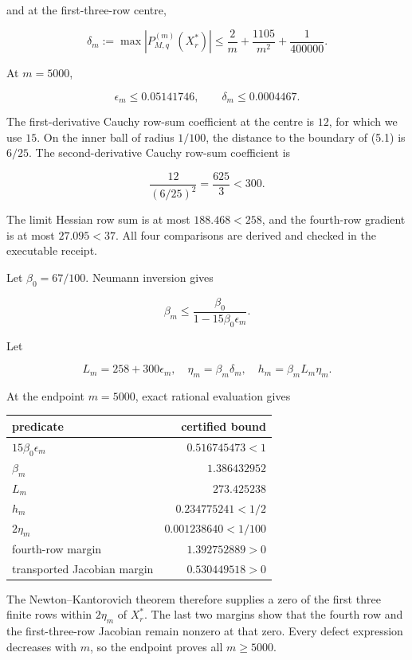 \documentclass[
  11pt,
  a4paper,
]{article}
\newcounter{none} %
\begin{document}
and at the first-three-row centre,

\[
\delta_m:=\max|P^{(m)}_{M,q}(X_r^*)|
\le\frac2m+\frac{1105}{m^2}+\frac1{400000}.
\tag{5.15}
\]

At \(m=5000\),

\[
\epsilon_m\le0.05141746,
\qquad
\delta_m\le0.0004467.
\tag{5.16}
\]

The first-derivative Cauchy row-sum coefficient at the centre is \(12\),
for which we use \(15\). On the inner ball of radius \(1/100\), the
distance to the boundary of (5.1) is \(6/25\). The second-derivative
Cauchy row-sum coefficient is

\[
\frac{12}{(6/25)^2}=\frac{625}{3}<300.
\tag{5.17}
\]

The limit Hessian row sum is at most \(188.468<258\), and the fourth-row
gradient is at most \(27.095<37\). All four comparisons are derived and
checked in the executable receipt.

Let \(\beta_0=67/100\). Neumann inversion gives

\[
\beta_m\le\frac{\beta_0}{1-15\beta_0\epsilon_m}.
\tag{5.18}
\]

Let

\[
L_m=258+300\epsilon_m,
\quad
\eta_m=\beta_m\delta_m,
\quad
h_m=\beta_mL_m\eta_m.
\tag{5.19}
\]

At the endpoint \(m=5000\), exact rational evaluation gives

{\def\LTcaptype{none} %
\begin{longtable}[]{@{}lr@{}}
\toprule\noalign{}
predicate & certified bound \\
\midrule\noalign{}
\endhead
\bottomrule\noalign{}
\endlastfoot
\(15\beta_0\epsilon_m\) & \(0.516745473<1\) \\
\(\beta_m\) & \(1.386432952\) \\
\(L_m\) & \(273.425238\) \\
\(h_m\) & \(0.234775241<1/2\) \\
\(2\eta_m\) & \(0.001238640<1/100\) \\
fourth-row margin & \(1.392752889>0\) \\
transported Jacobian margin & \(0.530449518>0\) \\
\end{longtable}
}

The Newton--Kantorovich theorem therefore supplies a zero of the first
three finite rows within \(2\eta_m\) of \(X_r^*\). The last two margins
show that the fourth row and the first-three-row Jacobian remain nonzero
at that zero. Every defect expression decreases with \(m\), so the
endpoint proves all \(m\ge5000\).
\end{document}
